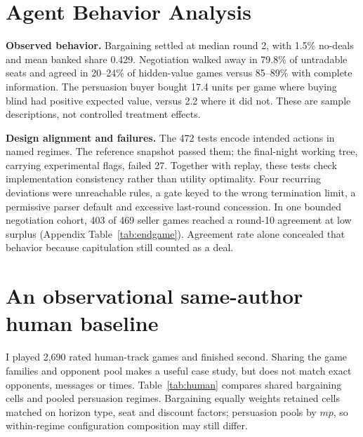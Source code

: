 \section{Agent Behavior Analysis}
\textbf{Observed behavior.} Bargaining settled at median round 2, with 1.5\%
no-deals and mean banked share 0.429. Negotiation walked away in 79.8\% of
untradable seats and agreed in 20--24\% of hidden-value games versus 85--89\%
with complete information. The persuasion buyer bought 17.4 units per game
where buying blind had positive expected value, versus 2.2 where it did not.
These are sample descriptions, not controlled treatment effects.

\textbf{Design alignment and failures.} The 472 tests encode intended actions
in named regimes. The reference snapshot passed them; the final-night working
tree, carrying experimental flags, failed 27. Together with replay, these tests
check implementation consistency rather than utility optimality. Four recurring
deviations were unreachable rules, a gate keyed to the wrong termination limit,
a permissive parser default and excessive last-round concession. In one bounded
negotiation cohort, 403 of 469 seller games reached a round-10 agreement at low
surplus (Appendix Table~\ref{tab:endgame}). Agreement rate alone concealed that
behavior because capitulation still counted as a deal.

\section{An observational same-author human baseline}
I played 2,690 rated human-track games and finished second. Sharing the game
families and opponent pool makes a useful case study, but does not match exact
opponents, messages or times. Table~\ref{tab:human} compares shared bargaining
cells and pooled persuasion regimes. Bargaining equally weights retained cells
matched on horizon type, seat and discount factors; persuasion pools by $mp$,
so within-regime configuration composition may still differ.

